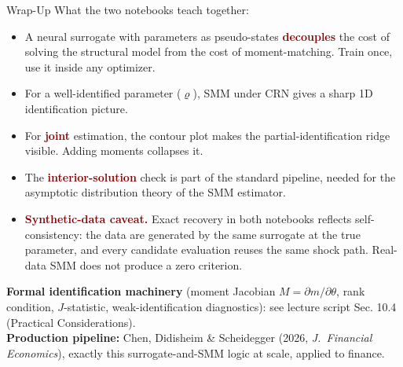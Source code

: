 \documentclass[10pt,aspectratio=169]{beamer}
\newcommand{\emphc}[1]{\textbf{\textcolor{darkred}{#1}}}
\begin{document}
\begin{frame}{Wrap-Up}
\small
What the two notebooks teach together:
\begin{itemize}
\itemsep1pt
  \item A neural surrogate with parameters as pseudo-states \emphc{decouples} the cost of solving the structural model from the cost of moment-matching. Train once, use it inside any optimizer.
  \item For a well-identified parameter ($\varrho$), SMM under CRN gives a sharp 1D identification picture.
  \item For \emphc{joint} estimation, the contour plot makes the partial-identification ridge visible. Adding moments collapses it.
  \item The \emphc{interior-solution} check is part of the standard pipeline, needed for the asymptotic distribution theory of the SMM estimator.
  \item \emphc{Synthetic-data caveat.} Exact recovery in both notebooks reflects self-consistency: the data are generated by the same surrogate at the true parameter, and every candidate evaluation reuses the same shock path. Real-data SMM does not produce a zero criterion.
\end{itemize}
\vspace{0.10cm}
{\footnotesize \textbf{Formal identification machinery} (moment Jacobian $M = \partial m/\partial\theta$, rank condition, $J$-statistic, weak-identification diagnostics): see lecture script Sec. 10.4 (Practical Considerations).}
\vspace{0.10cm}\\
\textbf{Production pipeline:} Chen, Didisheim \& Scheidegger (2026, \emph{J.\ Financial Economics}), exactly this surrogate-and-SMM logic at scale, applied to finance.
\end{frame}
\end{document}
